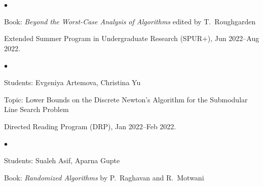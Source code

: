 \documentclass[margin,line]{res}
\newenvironment{list1}{
  \begin{list}{\ding{113}}{%
      \setlength{\itemsep}{0in}
      \setlength{\parsep}{0.025in} \setlength{\parskip}{0in}
      \setlength{\topsep}{0in} \setlength{\partopsep}{0in}
      \setlength{\leftmargin}{0.17in}}}{\end{list}}
\newenvironment{list2}{
  \begin{list}{$\bullet$}{%
      \setlength{\itemsep}{0in}
      \setlength{\parsep}{0in} \setlength{\parskip}{0in}
      \setlength{\topsep}{0in} \setlength{\partopsep}{0in}
      \setlength{\leftmargin}{0.2in}}}{\end{list}}
\newenvironment{list3}{
  \begin{list}{\ding{113}}{%
      \setlength{\itemsep}{0.05in}
      \setlength{\parsep}{0.025in} \setlength{\parskip}{0in}
      \setlength{\topsep}{0in} \setlength{\partopsep}{0in}
      \setlength{\leftmargin}{0.17in}}}{\end{list}}
\begin{document}
\begin{resume}
\begin{list3}
\begin{list2}
  \item[$\circ$] Book: \emph{Beyond the Worst-Case Analysis of Algorithms} edited by T.\ Roughgarden
  \end{list2}
\item[] Extended Summer Program in Undergraduate Research (SPUR+), Jun 2022--Aug 2022.
  \begin{list2}
  \item[$\circ$] Students: Evgeniya Artemova, Christina Yu
  \item[$\circ$] Topic: Lower Bounds on the Discrete Newton's Algorithm for the Submodular Line Search Problem
  \end{list2}
\item[] Directed Reading Program (DRP), Jan 2022--Feb 2022.
  \begin{list2}
  \item[$\circ$] Students: Sualeh Asif, Aparna Gupte
  \item[$\circ$] Book: \emph{Randomized Algorithms} by P.\ Raghavan and R.\ Motwani
  \end{list2}
\end{list3}







\end{resume}
\end{document}
